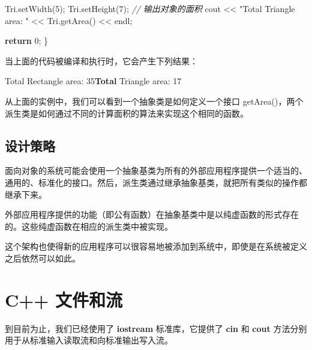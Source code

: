 \documentclass[
]{article}
\newenvironment{Shaded}{}{}
\newcommand{\CommentTok}[1]{\textcolor[rgb]{0.38,0.63,0.69}{\textit{#1}}}
\newcommand{\ControlFlowTok}[1]{\textcolor[rgb]{0.00,0.44,0.13}{\textbf{#1}}}
\newcommand{\DecValTok}[1]{\textcolor[rgb]{0.25,0.63,0.44}{#1}}
\newcommand{\ErrorTok}[1]{\textcolor[rgb]{1.00,0.00,0.00}{\textbf{#1}}}
\newcommand{\NormalTok}[1]{#1}
\newcommand{\OperatorTok}[1]{\textcolor[rgb]{0.40,0.40,0.40}{#1}}
\newcommand{\StringTok}[1]{\textcolor[rgb]{0.25,0.44,0.63}{#1}}
\begin{document}
\begin{Shaded}
\begin{Highlighting}[]
\NormalTok{   Tri}\OperatorTok{.}\NormalTok{setWidth}\OperatorTok{(}\DecValTok{5}\OperatorTok{);}
\NormalTok{   Tri}\OperatorTok{.}\NormalTok{setHeight}\OperatorTok{(}\DecValTok{7}\OperatorTok{);}
   \CommentTok{// 输出对象的面积}
\NormalTok{   cout }\OperatorTok{\textless{}\textless{}} \StringTok{"Total Triangle area: "} \OperatorTok{\textless{}\textless{}}\NormalTok{ Tri}\OperatorTok{.}\NormalTok{getArea}\OperatorTok{()} \OperatorTok{\textless{}\textless{}}\NormalTok{ endl}\OperatorTok{;} 

   \ControlFlowTok{return} \DecValTok{0}\OperatorTok{;}
\OperatorTok{\}}
\end{Highlighting}
\end{Shaded}

当上面的代码被编译和执行时，它会产生下列结果：

\begin{Shaded}
\begin{Highlighting}[]
\NormalTok{Total Rectangle area}\OperatorTok{:} \DecValTok{35}\ErrorTok{Total}\NormalTok{ Triangle area}\OperatorTok{:} \DecValTok{17}
\end{Highlighting}
\end{Shaded}

从上面的实例中，我们可以看到一个抽象类是如何定义一个接口
getArea()，两个派生类是如何通过不同的计算面积的算法来实现这个相同的函数。

\hypertarget{ux8bbeux8ba1ux7b56ux7565-2}{%
\subsection{设计策略}\label{ux8bbeux8ba1ux7b56ux7565-2}}

面向对象的系统可能会使用一个抽象基类为所有的外部应用程序提供一个适当的、通用的、标准化的接口。然后，派生类通过继承抽象基类，就把所有类似的操作都继承下来。

外部应用程序提供的功能（即公有函数）在抽象基类中是以纯虚函数的形式存在的。这些纯虚函数在相应的派生类中被实现。

这个架构也使得新的应用程序可以很容易地被添加到系统中，即使是在系统被定义之后依然可以如此。

\hypertarget{c-ux6587ux4ef6ux548cux6d41}{%
\section{C++ 文件和流}\label{c-ux6587ux4ef6ux548cux6d41}}

到目前为止，我们已经使用了 \textbf{iostream} 标准库，它提供了
\textbf{cin} 和 \textbf{cout}
方法分别用于从标准输入读取流和向标准输出写入流。
\end{document}
